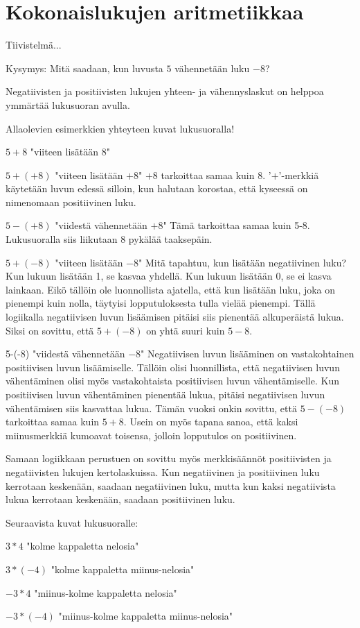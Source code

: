 \chapter{Kokonaislukujen aritmetiikkaa}

Tiivistelmä...

Kysymys: Mitä saadaan, kun luvusta $5$ vähennetään luku $-8$?

Negatiivisten ja positiivisten lukujen yhteen- ja vähennyslaskut on helppoa ymmärtää lukusuoran avulla.

Allaolevien esimerkkien yhteyteen kuvat lukusuoralla!

$5+8$ "viiteen lisätään $8$"

$5+(+8)$ "viiteen lisätään $+8$" $+8$ tarkoittaa samaa kuin $8$. '$+$'-merkkiä käytetään luvun edessä silloin, kun halutaan korostaa, että kyseessä on nimenomaan positiivinen luku.

$5-(+8)$ "viidestä vähennetään $+8$" Tämä tarkoittaa samaa kuin 5-8. Lukusuoralla siis liikutaan 8 pykälää taaksepäin.

$5+(-8)$ "viiteen lisätään $-8$" Mitä tapahtuu, kun lisätään negatiivinen luku? Kun lukuun lisätään 1, se kasvaa yhdellä. Kun lukuun lisätään 0, se ei kasva lainkaan. Eikö tällöin ole luonnollista ajatella, että kun lisätään luku, joka on pienempi kuin nolla, täytyisi lopputuloksesta tulla vielää pienempi. Tällä logiikalla negatiivisen luvun lisäämisen pitäisi siis pienentää alkuperäistä lukua. Siksi on sovittu, että $5+(-8)$ on yhtä suuri kuin $5-8$.

5-(-8) "viidestä vähennetään $-8$" Negatiivisen luvun lisääminen on vastakohtainen positiivisen luvun lisäämiselle. Tällöin olisi luonnillista, että negatiivisen luvun vähentäminen olisi myös vastakohtaista positiivisen luvun vähentämiselle. Kun positiivisen luvun vähentäminen pienentää lukua, pitäisi negatiivisen luvun vähentämisen siis kasvattaa lukua. Tämän vuoksi onkin sovittu, että $5-(-8)$ tarkoittaa samaa kuin $5+8$. Usein on myös tapana sanoa, että kaksi miinusmerkkiä kumoavat toisensa, jolloin lopputulos on positiivinen.

Samaan logiikkaan perustuen on sovittu myös merkkisäännöt positiivisten ja negatiivisten lukujen kertolaskuissa. Kun negatiivinen ja positiivinen luku kerrotaan keskenään, saadaan negatiivinen luku, mutta kun kaksi negatiivista lukua kerrotaan keskenään, saadaan positiivinen luku.

Seuraavista kuvat lukusuoralle:

$3*4$ "kolme kappaletta nelosia"

$3*(-4)$ "kolme kappaletta miinus-nelosia"

$-3*4$ "miinus-kolme kappaletta nelosia"

$-3*(-4)$ "miinus-kolme kappaletta miinus-nelosia"

